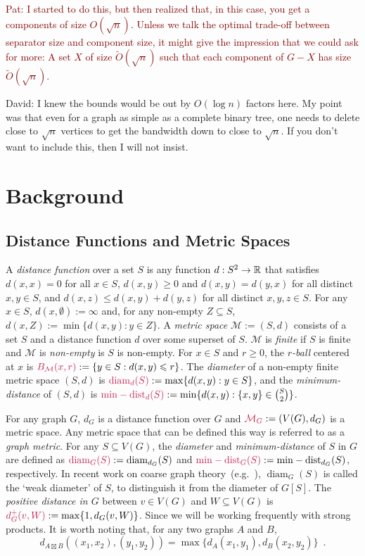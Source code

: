 \documentclass{patmorin}
\makeatletter
\renewcommand{\ge}{\geqslant}
\renewcommand{\le}{\leqslant}
\renewcommand{\geq}{\geqslant}
\newcommand{\david}[1]{{\color{orange} David: #1}}
\newcommand{\pat}[1]{\textcolor{Maroon}{Pat: #1}}
\newcommand{\defin}[1]{\emph{\textcolor{brightmaroon}{#1}}}
\def\mathcolor#1#{\@mathcolor{#1}}
\def\@mathcolor#1#2#3{%
  \protect\leavevmode
  \begingroup
    \color#1{#2}#3%
  \endgroup
}
\newcommand{\mathdefin}[1]{\mathcolor{brightmaroon}{#1}}
\DeclareMathOperator{\diam}{diam}
\DeclareMathOperator{\mindist}{min-dist}
\makeatother
\begin{document}
\pat{I started to do this, but then realized that, in this case, you get a components of size $O(\sqrt{n})$.  Unless we talk the optimal trade-off between separator size and component size, it might give the impression that we could ask for more:  A set $X$ of size $\tilde{O}(\sqrt{n})$ such that each component of $G-X$ has size $\tilde{O}(\sqrt{n})$.  }

\david{I knew the bounds would be out by $O(\log n)$ factors here. My point was that even for a graph as simple as a complete binary tree, one needs to delete close to $\sqrt{n}$ vertices to get the bandwidth down to close to $\sqrt{n}$. If you don't want to include this, then I will not insist. }

\section{Background}

\subsection{Distance Functions and Metric Spaces}

A \defin{distance function} over a set $S$ is any function $d:S^2\to\mathbb{R}$ that satisfies $d(x,x)=0$ for all $x\in S$, $d(x,y)\ge 0$ and $d(x,y)=d(y,x)$ for all distinct $x,y\in S$, and $d(x,z) \le d(x,y)+d(y,z)$ for all distinct $x,y,z\in S$.  For any $x\in S$, $d(x,\emptyset):=\infty$ and, for any non-empty $Z\subseteq S$, $d(x,Z):=\min\{d(x,y):y\in Z\}$.  A \defin{metric space} $\mathcal{M}:=(S,d)$ consists of a set $S$ and a distance function $d$ over some superset of $S$. $\mathcal{M}$ is \defin{finite} if $S$ is finite and $\mathcal{M}$ is \defin{non-empty} is $S$ is non-empty.  For $x\in S$ and $r\geq 0$, the \defin{$r$-ball} centered at $x$ is $\mathdefin{B_{\mathcal{M}}(x,r)}:=\{y\in S:d(x,y)\le r\}$.  The \defin{diameter} of a non-empty finite metric space $(S,d)$ is $\mathdefin{\diam_d(S)}:=\max\{d(x,y):y\in S\}$, and the
\defin{minimum-distance} of $(S,d)$ is $\mathdefin{\mindist_d(S)}:=\min\{d(x,y): \{x,y\}\in\binom{S}{2}\}$.

For any graph $G$, $d_G$ is a distance function over $G$ and $\mathdefin{\mathcal{M}_G}:=(V(G),d_G)$ is a metric space. Any metric space that can be defined this way is referred to as a \defin{graph metric}. For any $S\subseteq V(G)$, the \defin{diameter} and \defin{minimum-distance} of $S$ in $G$ are defined as $\mathdefin{\diam_G(S)}:=\diam_{d_G}(S)$ and $\mathdefin{\mindist_G(S)}:=\mindist_{d_G}(S)$, respectively. In recent work on coarse graph theory~(e.g.~\citep{DN23,BBEGLPS}), $\diam_G(S)$ is called the `weak diameter' of $S$, to distinguish it from the diameter of $G[S]$.
The \defin{positive distance in $G$} between $v\in V(G)$ and $W\subseteq V(G)$ is $\mathdefin{d^+_G(v,W)}:=\max\{1,d_G(v,W)\}$.
Since we will be working frequently with strong products. It is worth noting that, for any two graphs $A$ and $B$,
\[
  d_{A\boxtimes B}((x_1,x_2),(y_1,y_2))=\max\{d_A(x_1,y_1),d_B(x_2,y_2)\} \enspace .
\]
\end{document}
